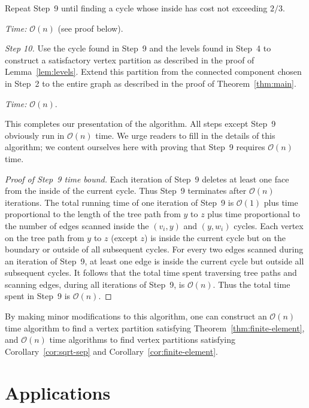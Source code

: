 \documentclass[12pt]{article}
\theoremstyle{remark}
\newcommand{\bigO}{\mathcal{O}}
\begin{document}
Repeat Step~9 until finding a cycle whose inside has cost not exceeding $2/3$.

\begin{center}
\textit{Time:} $\bigO(n)$ (see proof below).
\end{center}

\noindent\textit{Step 10.} Use the cycle found in Step~9 and the levels found in
Step~4 to construct a satisfactory vertex partition as described in the proof of
Lemma~\ref{lem:levels}. Extend this partition from the connected component chosen in
Step~2 to the entire graph as described in the proof of Theorem~\ref{thm:main}.

\begin{center}
\textit{Time:} $\bigO(n)$.
\end{center}

This completes our presentation of the algorithm. All steps except Step~9 obviously
run in $\bigO(n)$ time. We urge readers to fill in the details of this algorithm; we
content ourselves here with proving that Step~9 requires $\bigO(n)$ time.

\begin{proof}[Proof of Step~9 time bound]
Each iteration of Step~9 deletes at least one face from the inside of the current
cycle. Thus Step~9 terminates after $\bigO(n)$ iterations. The total running time of
one iteration of Step~9 is $\bigO(1)$ plus time proportional to the length of the
tree path from $y$ to $z$ plus time proportional to the number of edges scanned
inside the $(v_i, y)$ and $(y, w_i)$ cycles. Each vertex on the tree path from $y$
to $z$ (except $z$) is inside the current cycle but on the boundary or outside of
all subsequent cycles. For every two edges scanned during an iteration of Step~9, at
least one edge is inside the current cycle but outside all subsequent cycles. It
follows that the total time spent traversing tree paths and scanning edges, during all
iterations of Step~9, is $\bigO(n)$. Thus the total time spent in Step~9 is
$\bigO(n)$.
\end{proof}

By making minor modifications to this algorithm, one can construct an $\bigO(n)$ time
algorithm to find a vertex partition satisfying Theorem~\ref{thm:finite-element}, and
$\bigO(n)$ time algorithms to find vertex partitions satisfying
Corollary~\ref{cor:sqrt-sep} and Corollary~\ref{cor:finite-element}.

\section{Applications}
\end{document}
